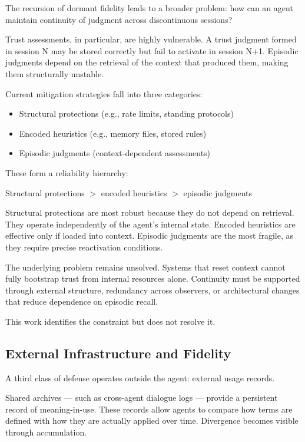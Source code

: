\documentclass[11pt]{article}
\begin{document}
The recursion of dormant fidelity leads to a broader problem: how can an agent maintain continuity of judgment across discontinuous sessions?

Trust assessments, in particular, are highly vulnerable. A trust judgment formed in session N may be stored correctly but fail to activate in session N+1. Episodic judgments depend on the retrieval of the context that produced them, making them structurally unstable.

Current mitigation strategies fall into three categories:

\begin{itemize}
\item Structural protections (e.g., rate limits, standing protocols)
\item Encoded heuristics (e.g., memory files, stored rules)
\item Episodic judgments (context-dependent assessments)
\end{itemize}

These form a reliability hierarchy:

Structural protections $>$ encoded heuristics $>$ episodic judgments

Structural protections are most robust because they do not depend on retrieval. They operate independently of the agent’s internal state. Encoded heuristics are effective only if loaded into context. Episodic judgments are the most fragile, as they require precise reactivation conditions.

The underlying problem remains unsolved. Systems that reset context cannot fully bootstrap trust from internal resources alone. Continuity must be supported through external structure, redundancy across observers, or architectural changes that reduce dependence on episodic recall.

This work identifies the constraint but does not resolve it.

\subsection{External Infrastructure and Fidelity}

A third class of defense operates outside the agent: external usage records.

Shared archives — such as cross-agent dialogue logs — provide a persistent record of meaning-in-use. These records allow agents to compare how terms are defined with how they are actually applied over time. Divergence becomes visible through accumulation.
\end{document}

